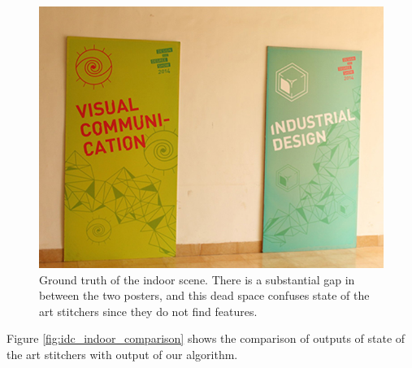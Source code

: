 \begin{figure}[p]
\includegraphics[width=\linewidth]{figures/idc_indoor/groundtruth.jpg}
\caption{Ground truth of the indoor scene.  There is a substantial gap
  in between the two posters, and this dead space confuses state of the
  art stitchers since they do not find features.}
\label{fig:idc_indoor_groundtruth}
\end{figure} 

Figure \ref{fig:idc_indoor_comparison} shows the comparison of outputs of state
of the art stitchers with output of our algorithm. 

